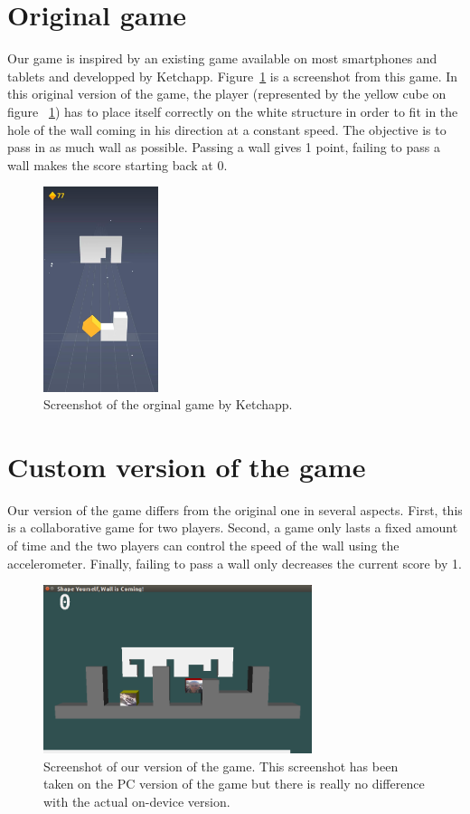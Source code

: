 \documentclass[english, DIV=13]{scrreprt}
\begin{document}
\section{Original game}
Our game is inspired by an existing game available on most smartphones and tablets
and developped by Ketchapp. Figure~\ref{fig:original-game} is a screenshot from this game.
In this original version of the game, the player (represented by the yellow cube on figure
~\ref{fig:original-game}) has to place itself correctly on the white structure in order
to fit in the hole of the wall coming in his direction at a constant speed. The objective
is to pass in as much wall as possible. Passing a wall gives 1 point, failing to pass a
wall makes the score starting back at 0.

\begin{figure}[bth]
    \centering
    \includegraphics[width=0.3\textwidth]{img/original-game}
    \caption{Screenshot of the orginal game by Ketchapp.}
    \label{fig:original-game}
\end{figure}

\section{Custom version of the game}
Our version of the game differs from the original one in several aspects. First, this
is a collaborative game for two players. Second, a game only lasts a fixed amount of time
and the two players can control the speed of the wall using the accelerometer.
Finally, failing to pass a wall only decreases the current score by 1. 

\begin{figure}[bth]
    \centering
    \includegraphics[width=0.7\textwidth]{img/custom-game-version}
    \caption{Screenshot of our version of the game. This screenshot has been taken
    on the PC version of the game but there is really no difference with the actual
    on-device version.}
    \label{fig:custom-game}
\end{figure}
\end{document}
